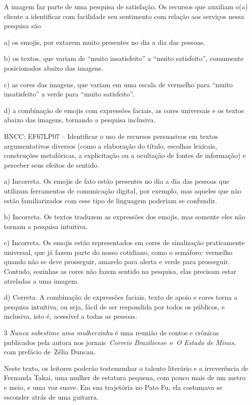 {A imagem faz parte de uma pesquisa de satisfação. Os recursos que
auxiliam o(a) cliente a identificar com facilidade seu sentimento com
relação aos serviços nessa pesquisa são

a) os emojis, por extarem muito presentes no dia a dia das pessoas.

b) os textos, que variam de ``muito insatisfeito'' a ``muito
satisfeito'', comumente posicionados abaixo das imagens.

c) as cores das imagens, que variam em uma escala de vermelho para
``muito insatisfeito'' a verde para ``muito satisfeito''.

d) a combinação de emojis com expressões faciais, as cores universais e
os textos abaixo das imagens, tornando a pesquisa inclusiva.

BNCC: EF67LP07 -- Identificar o uso de recursos persuasivos em textos
argumentativos diversos (como a elaboração do título, escolhas lexicais,
construções metafóricas, a explicitação ou a ocultação de fontes de
informação) e perceber seus efeitos de sentido.

a) Incorreta. Os emojis de fato estão presentes no dia a dia das pessoas
que utilizam ferramentas de comunicação digital, por exemplo, mas
aqueles que não estão familiarizados com esse tipo de linguagem poderiam
se confundir.

b) Incorreta. Os textos traduzem as expressões dos emojis, mas somente
eles não tornam a pesquisa intuitiva.

c) Incorreta. Os emojis estão representados em cores de sinalização
praticamente universal, que já fazem parte do nosso cotidiano, como o
semáforo: vermelho quando não se deve prosseguir, amarelo para alerta e
verde para prosseguir. Contudo, sozinhas as cores não fazem sentido na
pesquisa, elas precisam estar atreladas a uma imagem.

d) Correta. A combinação de expressões faciais, texto de apoio e cores
torna a pesquisa intuitiva, ou seja, fácil de ser respondida por todos
os públicos, e inclusiva, isto é, acessível a todas as pessoas.

\num{3} \emph{Nunca subestime uma mulherzinha} é uma reunião de contos e
crônicas publicados pela autora nos jornais~\emph{Correio
Braziliense}~e~\emph{O Estado de Minas}, com prefácio de~Zélia Duncan.

Neste texto, os leitores poderão testemunhar o talento literário e a
irreverência de Fernanda Takai, uma mulher de estatura pequena, com
pouco mais de um metro e meio, e uma voz suave. Em sua trajetória no
Pato Fu, ela costumava se esconder atrás de uma guitarra.

}
